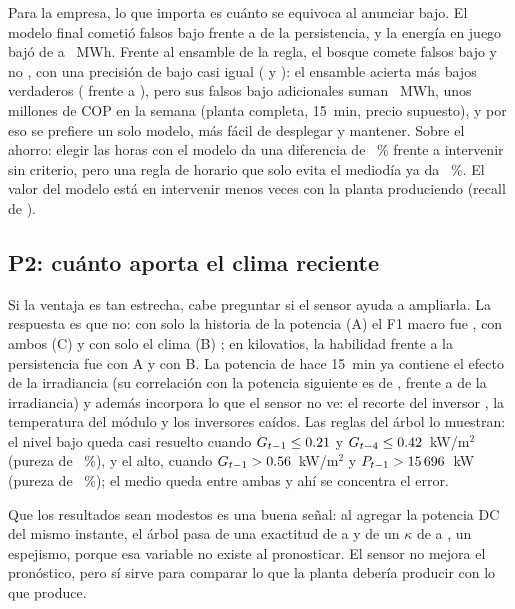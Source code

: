\documentclass[conference]{IEEEtran}
\begin{document}
Para la empresa, lo que importa es cu\'anto se equivoca al anunciar bajo. El modelo final cometi\'o \tFinFalsosBajo{} falsos bajo frente a \tPersFalsosBajo{} de la persistencia, y la energ\'ia en juego baj\'o de \tPersMWh{} a \tFinMWh{}~MWh. Frente al ensamble de la regla, el bosque comete \tFinFalsosBajo{} falsos bajo y no \tRoneFalsosBajo{}, con una precisi\'on de bajo casi igual (\tFinPrec{} y \tRonePrec{}): el ensamble acierta m\'as bajos verdaderos (\tpRone{} frente a \tpFin{}), pero sus \fbExtraRone{} falsos bajo adicionales suman \mwhDifRone{}~MWh, unos \copDifRone{} millones de COP en la semana (planta completa, 15~min, precio supuesto), y por eso se prefiere un solo modelo, m\'as f\'acil de desplegar y mantener. Sobre el ahorro: elegir las horas con el modelo da una diferencia de \ahorroFin{}~\% frente a intervenir sin criterio, pero una regla de horario que solo evita el mediod\'ia ya da \ahorroRegla{}~\%. El valor del modelo est\'a en intervenir menos veces con la planta produciendo (recall de \tFinRec{}).

\subsection{P2: cu\'anto aporta el clima reciente}
Si la ventaja es tan estrecha, cabe preguntar si el sensor ayuda a ampliarla. La respuesta es que no: con solo la historia de la potencia (A) el F1 macro fue \fConjA{}, con ambos (C) \fConjC{} y con solo el clima (B) \fConjB{}; en kilovatios, la habilidad frente a la persistencia fue \habA{} con A y \habB{} con B. La potencia de hace 15~min ya contiene el efecto de la irradiancia (su correlaci\'on con la potencia siguiente es de \corrpot{}, frente a \corrirr{} de la irradiancia) y adem\'as incorpora lo que el sensor no ve: el recorte del inversor \cite{good}, la temperatura del m\'odulo \cite{skoplaki} y los inversores ca\'idos. Las reglas del \'arbol lo muestran: el nivel bajo queda casi resuelto cuando $G_{t-1}\le0.21{}$ y $G_{t-4}\le0.42{}$~kW/m$^2$ (pureza de \reglaBajoPureza{}~\%), y el alto, cuando $G_{t-1}>0.56{}$~kW/m$^2$ y $P_{t-1}>15\,696{}$~kW (pureza de \reglaAltoPureza{}~\%); el medio queda entre ambas y ah\'i se concentra el error.

Que los resultados sean modestos es una buena se\~nal: al agregar la potencia DC del mismo instante, el \'arbol pasa de una exactitud de \fugaAccSin{} a \fugaAccCon{} y de un $\kappa$ de \fugaKappaSin{} a \fugaKappaCon{}, un espejismo, porque esa variable no existe al pronosticar. El sensor no mejora el pron\'ostico, pero s\'i sirve para comparar lo que la planta deber\'ia producir con lo que produce.
\end{document}
